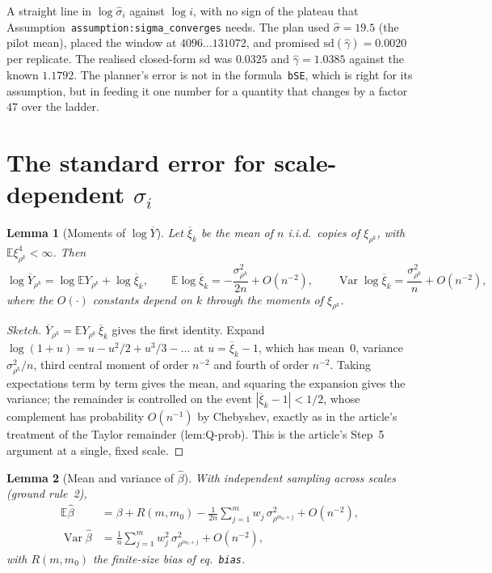 \documentclass[11pt]{article}
\newtheorem{lemma}{Lemma}
\newcommand{\E}{\mathbb{E}}
\newcommand{\Var}{\operatorname{Var}}
\begin{document}
\noindent A straight line in $\log\hat\sigma_i$ against $\log i$, with no sign of
the plateau that Assumption~\texttt{assumption:}\allowbreak\texttt{sigma\_converges} needs. The
plan used $\hat\sigma=19.5$ (the pilot mean), placed the window at
$4096\ldots131072$, and promised $\mathrm{sd}(\hat\gamma)=0.0020$ per replicate.
The realised closed-form sd was $0.0325$ and $\hat\gamma=1.0385$ against the
known $1.1792$. The planner's error is not in the formula~\texttt{bSE}, which
is right for its assumption, but in feeding it one number for a quantity that
changes by a factor~$47$ over the ladder.

\section{The standard error for scale-dependent \texorpdfstring{$\sigma_i$}{sigma\_i}}

\begin{lemma}[Moments of $\log\overline Y$]\label{lem:logmoments}
Let $\overline\xi_k$ be the mean of $n$ i.i.d.\ copies of $\xi_{\rho^k}$, with
$\E\xi_{\rho^k}^{4}<\infty$. Then
\[
  \log\overline Y_{\rho^k}=\log\E Y_{\rho^k}+\log\overline\xi_k,
  \qquad
  \E\log\overline\xi_k=-\frac{\sigma_{\rho^k}^2}{2n}+O(n^{-2}),
  \qquad
  \Var\log\overline\xi_k=\frac{\sigma_{\rho^k}^2}{n}+O(n^{-2}),
\]
where the $O(\cdot)$ constants depend on $k$ through the moments of
$\xi_{\rho^k}$.
\end{lemma}

\begin{proof}[Sketch]
$\overline Y_{\rho^k}=\E Y_{\rho^k}\,\overline\xi_k$ gives the first identity.
Expand $\log(1+u)=u-u^2/2+u^3/3-\dots$ at $u=\overline\xi_k-1$, which has
mean~$0$, variance $\sigma_{\rho^k}^2/n$, third central moment of order
$n^{-2}$ and fourth of order $n^{-2}$. Taking expectations term by term gives
the mean, and squaring the expansion gives the variance; the remainder is
controlled on the event
$|\overline\xi_k-1|<1/2$, whose complement has probability $O(n^{-1})$ by
Chebyshev, exactly as in the article's treatment of the Taylor remainder
(lem:Q-prob). This is the article's Step~5 argument at a single, fixed scale.
\end{proof}

\begin{lemma}[Mean and variance of $\hat\beta$]\label{lem:betamoments}
With independent sampling across scales (ground rule~2),
\begin{align}
  \E\hat\beta&=\beta+R(m,m_0)-\frac{1}{2n}\sum_{j=1}^m w_j\,\sigma_{\rho^{m_0+j}}^2+O(n^{-2}),
  \label{eq:Ebeta}\\
  \Var\hat\beta&=\frac{1}{n}\sum_{j=1}^m w_j^2\,\sigma_{\rho^{m_0+j}}^2+O(n^{-2}),
  \label{eq:Varbeta}
\end{align}
with $R(m,m_0)$ the finite-size bias of eq.~\texttt{bias}.
\end{lemma}
\end{document}
